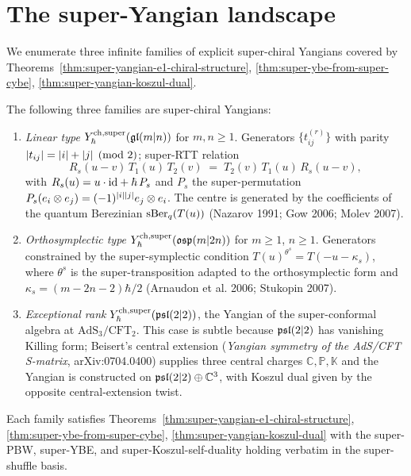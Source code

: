 \section{The super-Yangian landscape}
\label{sec:super-landscape}

We enumerate three infinite families of explicit super-chiral Yangians
covered by Theorems~\ref{thm:super-yangian-e1-chiral-structure},
\ref{thm:super-ybe-from-super-cybe}, \ref{thm:super-yangian-koszul-dual}.

\begin{theorem}
\label{thm:super-yangian-landscape}
The following three families are super-chiral Yangians:
\begin{enumerate}[label=\textup{(\roman*)}]
\item \emph{Linear type} $Y^{\mathrm{ch},\mathrm{super}}_{\hbar}(\mathfrak{gl}(m|n))$ for $m,n\ge 1$.
 Generators $\{t_{ij}^{(r)}\}$ with parity
 $|t_{ij}| = |i|+|j|\pmod 2$; super-RTT relation
 \begin{equation}
 \label{eq:super-rtt}
 R_s(u-v)\,T_1(u)\,T_2(v)\;=\;T_2(v)\,T_1(u)\,R_s(u-v),
 \end{equation}
 with $R_s(u) = u\cdot \mathrm{id} + \hbar\,P_s$ and $P_s$ the super-permutation
 $P_s(e_i\otimes e_j) = (-1)^{|i||j|} e_j\otimes e_i$.
 The centre is generated by the coefficients of the quantum Berezinian
 $\operatorname{sBer}_q(T(u))$ (Nazarov 1991; Gow 2006; Molev 2007).
\item \emph{Orthosymplectic type} $Y^{\mathrm{ch},\mathrm{super}}_{\hbar}(\mathfrak{osp}(m|2n))$ for
 $m\ge 1$, $n\ge 1$. Generators constrained by the super-symplectic
 condition $T(u)^{\theta^s} = T(-u-\kappa_s)$, where $\theta^s$ is the
 super-transposition adapted to the orthosymplectic form and
 $\kappa_s = (m-2n-2)\hbar/2$ (Arnaudon et al. 2006; Stukopin 2007).
\item \emph{Exceptional rank} $Y^{\mathrm{ch},\mathrm{super}}_{\hbar}(\mathfrak{psl}(2|2))$, the
 Yangian of the super-conformal algebra at
 $\mathrm{AdS}_3/\mathrm{CFT}_2$. This case is subtle because
 $\mathfrak{psl}(2|2)$ has vanishing Killing form; Beisert's central extension
 (\emph{Yangian symmetry of the AdS/CFT S-matrix}, arXiv:0704.0400)
 supplies three central charges $\mathbb{C}, \mathbb{P}, \mathbb{K}$
 and the Yangian is constructed on
 $\mathfrak{psl}(2|2)\oplus\mathbb{C}^3$, with Koszul dual given by
 the opposite central-extension twist.
\end{enumerate}
Each family satisfies Theorems~\ref{thm:super-yangian-e1-chiral-structure},
\ref{thm:super-ybe-from-super-cybe}, \ref{thm:super-yangian-koszul-dual}
with the super-PBW, super-YBE, and super-Koszul-self-duality holding
verbatim in the super-shuffle basis.
\end{theorem}

